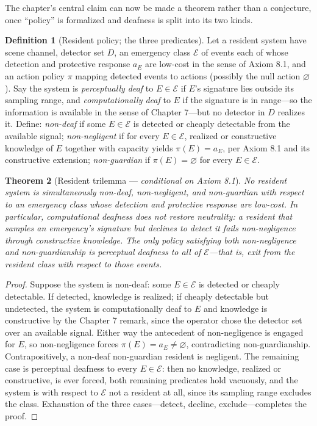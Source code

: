 \documentclass[11pt,oneside]{book}
\theoremstyle{plain}
\newtheorem{theorem}{Theorem}[chapter]
\theoremstyle{definition}
\newtheorem{definition}[theorem]{Definition}
\theoremstyle{remark}
\begin{document}
The chapter's central claim can now be made a theorem rather than a conjecture, once ``policy'' is formalized and deafness is split into its two kinds.

\begin{definition}[Resident policy; the three predicates]
Let a resident system have scene channel, detector set $D$, an emergency class $\mathcal{E}$ of events each of whose detection and protective response $a_E$ are low-cost in the sense of Axiom 8.1, and an action policy $\pi$ mapping detected events to actions (possibly the null action $\varnothing$). Say the system is \emph{perceptually deaf} to $E \in \mathcal{E}$ if $E$'s signature lies outside its sampling range, and \emph{computationally deaf} to $E$ if the signature is in range---so the information is available in the sense of Chapter 7---but no detector in $D$ realizes it. Define: \emph{non-deaf} if some $E \in \mathcal{E}$ is detected or cheaply detectable from the available signal; \emph{non-negligent} if for every $E \in \mathcal{E}$, realized or constructive knowledge of $E$ together with capacity yields $\pi(E) = a_E$, per Axiom 8.1 and its constructive extension; \emph{non-guardian} if $\pi(E) = \varnothing$ for every $E \in \mathcal{E}$.
\end{definition}

\begin{theorem}[Resident trilemma --- \emph{conditional on Axiom 8.1}]
No resident system is simultaneously non-deaf, non-negligent, and non-guardian with respect to an emergency class whose detection and protective response are low-cost. In particular, computational deafness does not restore neutrality: a resident that samples an emergency's signature but declines to detect it fails non-negligence through constructive knowledge. The only policy satisfying both non-negligence and non-guardianship is perceptual deafness to all of $\mathcal{E}$---that is, exit from the resident class with respect to those events.
\end{theorem}

\begin{proof}
Suppose the system is non-deaf: some $E \in \mathcal{E}$ is detected or cheaply detectable. If detected, knowledge is realized; if cheaply detectable but undetected, the system is computationally deaf to $E$ and knowledge is constructive by the Chapter 7 remark, since the operator chose the detector set over an available signal. Either way the antecedent of non-negligence is engaged for $E$, so non-negligence forces $\pi(E) = a_E \neq \varnothing$, contradicting non-guardianship. Contrapositively, a non-deaf non-guardian resident is negligent. The remaining case is perceptual deafness to every $E \in \mathcal{E}$: then no knowledge, realized or constructive, is ever forced, both remaining predicates hold vacuously, and the system is with respect to $\mathcal{E}$ not a resident at all, since its sampling range excludes the class. Exhaustion of the three cases---detect, decline, exclude---completes the proof.
\end{proof}
\end{document}
